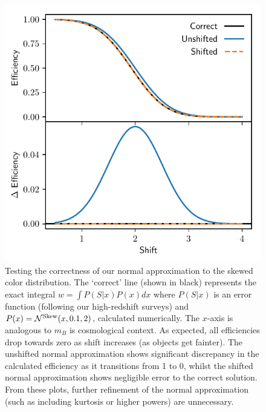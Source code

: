 \documentclass[twocolumn,trackchanges,tighten]{aastex62}
\begin{document}
\begin{figure}
	\begin{center}
		\includegraphics[width=\columnwidth]{shift.pdf}
	\end{center}
	\caption{Testing the correctness of our normal approximation to the skewed color distribution. The `correct' line (shown in black) represents the exact integral $w = \int P(S|x) P(x) dx$ where $P(S|x)$ is an error function (following our high-redshift surveys) and $P(x) = \mathcal{N}^{\rm Skew}(x, 0.1, 2)$, calculated numerically. The $x$-axis is analogous to $m_B$ is cosmological context. As expected, all efficiencies drop towards zero as shift increases (as objects get fainter). The unshifted normal approximation shows significant discrepancy in the calculated efficiency as it transitions from 1 to 0, whilst the shifted normal approximation shows negligible error to the correct solution. From these plots, further refinement of the normal approximation (such as including kurtosis or higher powers) are unnecessary.}
	\label{fig:shift}
\end{figure}
\end{document}
